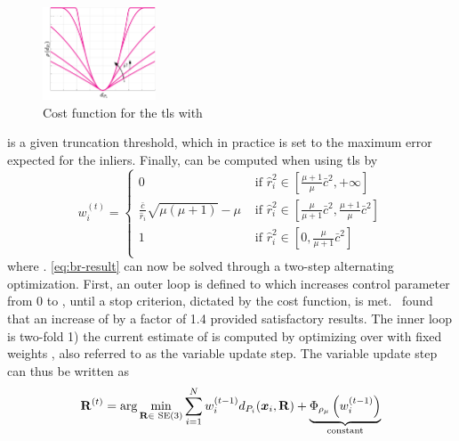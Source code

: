 \begin{figure}[!h]
	\begin{center}
		\includegraphics[width=0.3\textwidth]{chapters/2-pose-estimation/fig/tls-cost.pdf}
	\end{center}
	\caption{Cost function for the \gls{tls} with }
	\label{fig:tls-cost}
\end{figure}
 is a given truncation threshold, which in practice is set to the maximum error expected for the inliers. Finally,  can be computed when using \gls{tls} by
%
\begin{equation}\label{eq:tls-weights}
	w_i^{(t)} = \begin{cases}
		0 & \text{ if } \hat{r}_i^2\in\left[ \frac{\mu+1}{\mu}\bar{c}^2, +\infty \right] \\
		\frac{\bar{c}}{\hat{r}_i}\sqrt{\mu(\mu+1)} - \mu & \text{ if } \hat{r}_i^2\in\left[ \frac{\mu}{\mu+1}\bar{c}^2, \frac{\mu + 1}{\mu}\bar{c}^2 \right] \\
		1 & \text{ if } \hat{r}_i^2\in\left[ 0, \frac{\mu}{\mu + 1}\bar{c}^2 \right] \\
	\end{cases}
\end{equation}
where . \eqref{eq:br-result} can now be solved through a two-step alternating optimization. First, an outer loop is defined to which increases control parameter \mvar{\mu} from \num{0} to \mvar{\infty}, until a stop criterion, dictated by the cost function, is met.~\cite{graduated-non-convexity-for-robust-spatial-perception:-from-non-minimal-solvers-to-global-outlier-rejection} found that an increase of \mvar{\mu} by a factor of \num{1.4} provided satisfactory results.
The inner loop is two-fold 1) the current estimate of  is computed by optimizing over \tf[R]{}{} with fixed weights , also referred to as the variable update step. The variable update step can thus be written as
%
\begin{equation}\label{eq:variable-update}
	\tf[R]{(t)}{} = \arg\min_{\mat{R}\in\SE (3)} \sum^N_{i=1}w_i^{(t-1)}d_{P_i}(\vec{x}_i,\mat{R}) + \underbrace{\Phi_{\rho_\mu}\left(w_i^{(t-1)}\right)}_{\text{constant}}
\end{equation}

